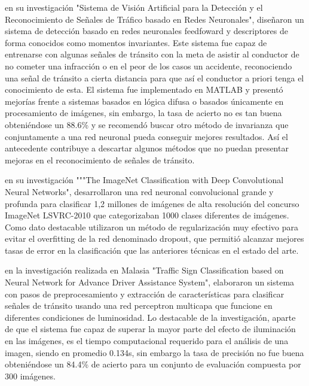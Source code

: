 		\citep{Rocha2010} en su investigación "Sistema de Visión Artificial para la Detección y el Reconocimiento de Señales de Tráfico basado en Redes Neuronales", diseñaron un sistema de detección basado en redes neuronales feedfoward y descriptores de forma conocidos como momentos invariantes. Este sistema fue capaz de entrenarse con algunas señales de tránsito con la meta de asistir al conductor de no cometer una infracción o en el peor de los casos un accidente, reconociendo una señal de tránsito a cierta distancia para que así el conductor a priori tenga el conocimiento de esta. El sistema fue implementado en MATLAB y presentó mejorías frente a sistemas basados en lógica difusa o basados únicamente en procesamiento de imágenes, sin embargo, la tasa de acierto no es tan buena obteniéndose un 88.6\% y se recomendó buscar otro método de invarianza que conjuntamente a una red neuronal pueda conseguir mejores resultados. Así el antecedente contribuye a descartar algunos métodos que no puedan presentar mejoras en el reconocimiento de señales de tránsito.
		\vskip 0.4cm

		\citep{Krizhevsky2012} en su investigación """The ImageNet Classification with Deep Convolutional Neural Networks", desarrollaron una red neuronal convolucional grande y profunda para clasificar 1,2 millones de imágenes de alta resolución del concurso ImageNet LSVRC-2010 que categorizaban 1000 clases diferentes de imágenes. Como dato destacable utilizaron un método de regularización muy efectivo para evitar el overfitting de la red denominado dropout, que permitió alcanzar mejores tasas de error en la clasificación que las anteriores técnicas en el estado del arte.
		\vskip 0.4cm	

		\citep{Hannan2014} en la investigación realizada en Malasia "Traffic Sign Classification based on Neural Network for Advance Driver Assistance System", elaboraron un sistema con pasos de preprocesamiento y extracción de características para clasificar señales de tránsito usando una red perceptron multicapa que funcione en diferentes condiciones de luminosidad. Lo destacable de la investigación, aparte de que el sistema fue capaz de superar la mayor parte del efecto de iluminación en las imágenes, es el tiempo computacional requerido para el análisis de una imagen, siendo en promedio 0.134s, sin embargo la tasa de precisión no fue buena obteniéndose un 84.4\% de acierto para un conjunto de evaluación compuesta por 300 imágenes. 
		\vskip 0.4cm	

